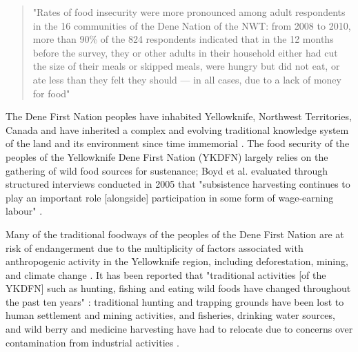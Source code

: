 \documentclass{report}
\begin{document}
\begin{quote}
  "Rates of food insecurity were more pronounced among adult respondents in the 16 communities of the Dene Nation of the NWT: from 2008 to 2010, more than 90\% of the 824 respondents indicated that in the 12 months before the survey, they or other adults in their household either had cut the size of their meals or skipped meals, were hungry but did not eat, or ate less than they felt they should — in all cases, due to a lack of money for food" \parencite{aboriginalfoodsecurity}
\end{quote}


\hspace{24pt} The Dene First Nation peoples have inhabited Yellowknife, Northwest Territories, Canada and have inherited a complex and evolving traditional knowledge system of the land and its environment since time immemorial \parencite{lorecapturingtraditional}.
The food security of the peoples of the Yellowknife Dene First Nation (YKDFN) largely relies on the gathering of wild food sources for sustenance;
Boyd et al. evaluated through structured interviews conducted in 2005 that "subsistence harvesting continues to play an important role [alongside] participation in some form of wage-earning labour" \parencite{socialculturalcapital}.



\hspace{24pt} Many of the traditional foodways of the peoples of the Dene First Nation are at risk of endangerment due to the multiplicity of factors associated with anthropogenic activity in the Yellowknife region, including deforestation, mining, and climate change \parencite{denefoodwaysontologies}.
It has been reported that "traditional activities [of the YKDFN] such as hunting, fishing and eating wild foods have changed throughout the past ten years" \parencite{socialculturalcapital}:
traditional hunting and trapping grounds have been lost to human settlement and mining activities, and fisheries, drinking water sources, and wild berry and medicine harvesting have had to relocate due to concerns over contamination from industrial activities \parencite{riskperceptions}.
\end{document}
